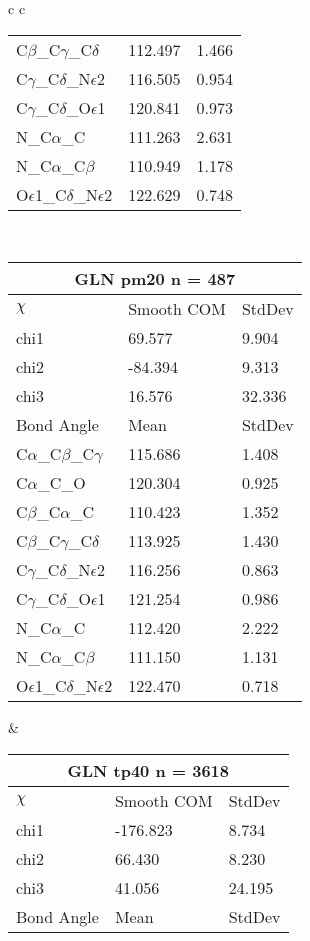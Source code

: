 \begin{longtable}{ c c }
\begin{tabular}{ l l l }
  C$\beta$\_C$\gamma$\_C$\delta$ & 112.497 & 1.466\\
  C$\gamma$\_C$\delta$\_N$\epsilon$2 & 116.505 & 0.954\\
  C$\gamma$\_C$\delta$\_O$\epsilon$1 & 120.841 & 0.973\\
  N\_C$\alpha$\_C & 111.263 & 2.631\\
  N\_C$\alpha$\_C$\beta$ & 110.949 & 1.178\\
  O$\epsilon$1\_C$\delta$\_N$\epsilon$2 & 122.629 & 0.748\\
  \bottomrule
  \end{tabular}
  \\
  \begin{tabular}{ l l l }
  \toprule
  \multicolumn{3}{c}{GLN \textbf{pm20} n = 487} \\ \toprule
  $\chi$       & Smooth COM & StdDev \\ \midrule
  chi1 & 69.577 & 9.904 \\ 
  chi2 & -84.394 & 9.313 \\ 
  chi3 & 16.576 & 32.336 \\ \midrule
  Bond Angle   & Mean     & StdDev \\ \midrule
  C$\alpha$\_C$\beta$\_C$\gamma$ & 115.686 & 1.408\\
  C$\alpha$\_C\_O & 120.304 & 0.925\\
  C$\beta$\_C$\alpha$\_C & 110.423 & 1.352\\
  C$\beta$\_C$\gamma$\_C$\delta$ & 113.925 & 1.430\\
  C$\gamma$\_C$\delta$\_N$\epsilon$2 & 116.256 & 0.863\\
  C$\gamma$\_C$\delta$\_O$\epsilon$1 & 121.254 & 0.986\\
  N\_C$\alpha$\_C & 112.420 & 2.222\\
  N\_C$\alpha$\_C$\beta$ & 111.150 & 1.131\\
  O$\epsilon$1\_C$\delta$\_N$\epsilon$2 & 122.470 & 0.718\\
  \bottomrule
  \end{tabular}
  &
  \begin{tabular}{ l l l }
  \toprule
  \multicolumn{3}{c}{GLN \textbf{tp40} n = 3618} \\ \toprule
  $\chi$       & Smooth COM & StdDev \\ \midrule
  chi1 & -176.823 & 8.734 \\ 
  chi2 & 66.430 & 8.230 \\ 
  chi3 & 41.056 & 24.195 \\ \midrule
  Bond Angle   & Mean     & StdDev \\ \midrule

\end{tabular}
\end{longtable}
